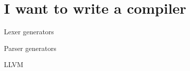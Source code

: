 \documentclass[../index.tex]{subfiles}
\begin{document}

\renewcommand{\sectiontitle}{I want to write a compiler}
\section{\sectiontitle}

\renewcommand{\currenttitle}{Lexer generators}
\begin{frame}{\currenttitle}
\end{frame}

\renewcommand{\currenttitle}{Parser generators}
\begin{frame}{\currenttitle}
\end{frame}

\renewcommand{\currenttitle}{LLVM}
\begin{frame}{\currenttitle}
\end{frame}

\end{document}
